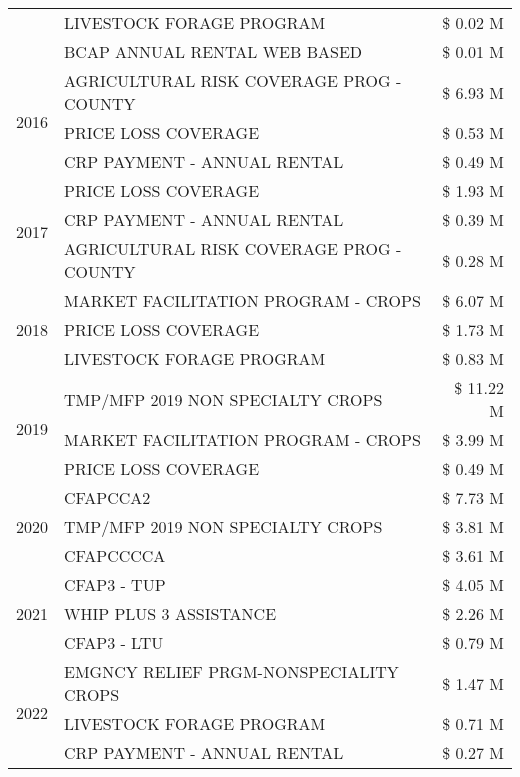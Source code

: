 \begin{tabular}{llr}
 & LIVESTOCK FORAGE PROGRAM & \$ 0.02 M \\
 & BCAP ANNUAL RENTAL WEB BASED & \$ 0.01 M \\
\cline{1-3}
\multirow[t]{3}{*}{2016} & AGRICULTURAL RISK COVERAGE PROG - COUNTY & \$ 6.93 M \\
 & PRICE LOSS COVERAGE & \$ 0.53 M \\
 & CRP PAYMENT - ANNUAL RENTAL & \$ 0.49 M \\
\cline{1-3}
\multirow[t]{3}{*}{2017} & PRICE LOSS COVERAGE & \$ 1.93 M \\
 & CRP PAYMENT - ANNUAL RENTAL & \$ 0.39 M \\
 & AGRICULTURAL RISK COVERAGE PROG - COUNTY & \$ 0.28 M \\
\cline{1-3}
\multirow[t]{3}{*}{2018} & MARKET FACILITATION PROGRAM - CROPS & \$ 6.07 M \\
 & PRICE LOSS COVERAGE & \$ 1.73 M \\
 & LIVESTOCK FORAGE PROGRAM & \$ 0.83 M \\
\cline{1-3}
\multirow[t]{3}{*}{2019} & TMP/MFP 2019 NON SPECIALTY CROPS & \$ 11.22 M \\
 & MARKET FACILITATION PROGRAM - CROPS & \$ 3.99 M \\
 & PRICE LOSS COVERAGE & \$ 0.49 M \\
\cline{1-3}
\multirow[t]{3}{*}{2020} & CFAPCCA2 & \$ 7.73 M \\
 & TMP/MFP 2019 NON SPECIALTY CROPS & \$ 3.81 M \\
 & CFAPCCCCA & \$ 3.61 M \\
\cline{1-3}
\multirow[t]{3}{*}{2021} & CFAP3 - TUP & \$ 4.05 M \\
 & WHIP PLUS 3 ASSISTANCE & \$ 2.26 M \\
 & CFAP3 - LTU & \$ 0.79 M \\
\cline{1-3}
\multirow[t]{3}{*}{2022} & EMGNCY RELIEF PRGM-NONSPECIALITY CROPS & \$ 1.47 M \\
 & LIVESTOCK FORAGE PROGRAM & \$ 0.71 M \\
 & CRP PAYMENT - ANNUAL RENTAL & \$ 0.27 M \\
\cline{1-3}
\bottomrule
\end{tabular}
